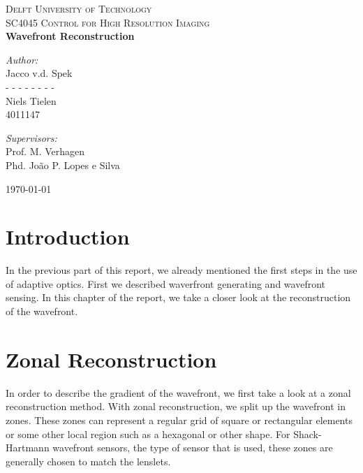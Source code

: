 \documentclass{article}
\begin{document}
\begin{titlepage}
\begin{center}

\textsc{\LARGE Delft University of Technology}\\[1.5cm]
\textsc{ SC4045 Control for High Resolution Imaging}\\[0.5cm]

{\huge\bfseries Wavefront Reconstruction \\[0.4cm] }

\begin{minipage}{0.4\textwidth}
\begin{flushleft} \large
\emph{Author:}\\
Jacco v.d. Spek \\
- - - - - - - - \\
Niels Tielen \\
4011147

\end{flushleft}
\end{minipage}
\begin{minipage}{0.4\textwidth}
\begin{flushright} \large
\emph{Supervisors:} \\
Prof. M. Verhagen \\
Phd. João P. Lopes e Silva  
\end{flushright}
\end{minipage}

\vfill
{\large \today}
\end{center}
\end{titlepage}

\section*{Introduction}

In the previous part of this report, we already mentioned the first steps in the use of adaptive optics. First we described waverfront generating and wavefront sensing. In this chapter of the report, we take a closer look at the reconstruction of the wavefront. 

\section{Zonal Reconstruction}
In order to describe the gradient of the wavefront, we first take a look at a zonal reconstruction method. With zonal reconstruction, we split up the wavefront in zones. These zones can represent a regular grid of square or rectangular elements or some other local region such as a hexagonal or other shape. For Shack-Hartmann wavefront sensors, the type of sensor that is used, these zones are generally chosen to match the lenslets.
\end{document}
